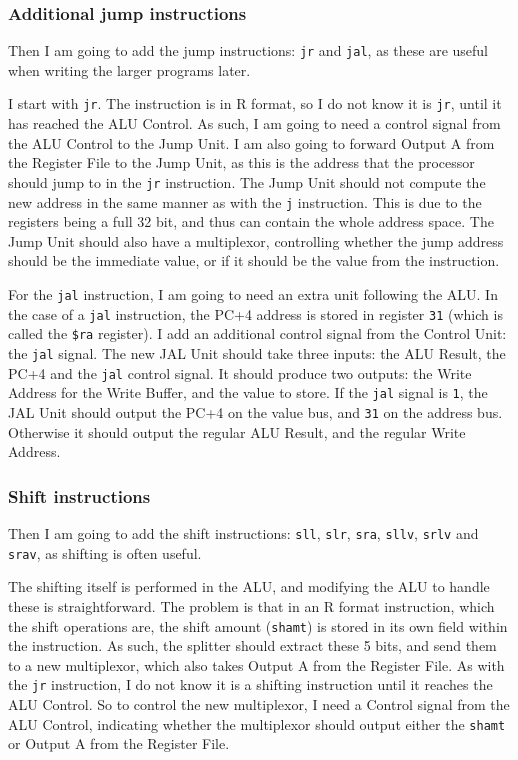 \subsubsection*{Additional jump instructions}
Then I am going to add the jump instructions: \texttt{jr} and \texttt{jal},
as these are useful when writing the larger programs later.

I start with \texttt{jr}. The instruction is in R format, so I do not know it
is \texttt{jr}, until it has reached the ALU Control. As such, I am going to
need a control signal from the ALU Control to the Jump Unit. I am also going
to forward Output A from the Register File to the Jump Unit, as this is the
address that the processor should jump to in the \texttt{jr} instruction. The
Jump Unit should not compute the new address in the same manner as with the
\texttt{j} instruction. This is due to the registers being a full 32 bit, and
thus can contain the whole address space. The Jump Unit should also have a
multiplexor, controlling whether the jump address should be the immediate
value, or if it should be the value from the instruction.

For the \texttt{jal} instruction, I am going to need an extra unit following
the ALU. In the case of a \texttt{jal} instruction, the PC+4 address is stored
in register \texttt{31} (which is called the \texttt{\$ra} register).  I add an
additional control signal from the Control Unit: the \texttt{jal} signal. The
new JAL Unit should take three inputs: the ALU Result, the PC+4 and the
\texttt{jal} control signal. It should produce two outputs: the Write Address
for the Write Buffer, and the value to store. If the \texttt{jal} signal is
\texttt{1}, the JAL Unit should output the PC+4 on the value bus, and
\texttt{31} on the address bus. Otherwise it should output the regular ALU
Result, and the regular Write Address.

\subsubsection*{Shift instructions}
Then I am going to add the shift instructions: \texttt{sll}, \texttt{slr},
\texttt{sra}, \texttt{sllv}, \texttt{srlv} and \texttt{srav}, as shifting is
often useful.

The shifting itself is performed in the ALU, and modifying the ALU to handle
these is straightforward. The problem is that in an R format instruction, which
the shift operations are, the shift amount (\texttt{shamt}) is stored in its
own field within the instruction. As such, the splitter should extract these 5
bits, and send them to a new multiplexor, which also takes Output A from the
Register File. As with the \texttt{jr} instruction, I do not know it is a
shifting instruction until it reaches the ALU Control. So to control the new
multiplexor, I need a Control signal from the ALU Control, indicating whether
the multiplexor should output either the \texttt{shamt} or Output A from the
Register File.

